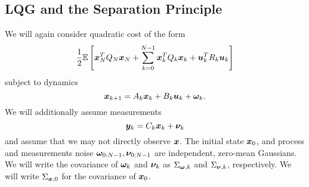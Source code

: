\subsection{LQG and the Separation Principle}

We will again consider quadratic cost of the form
\begin{equation}
    \frac{1}{2} \mathbb{E}\left[ \bm{x}_N^T Q_N \bm{x}_N + \sum_{k=0}^{N-1} \bm{x}_k^T Q_k \bm{x}_k + \bm{u}_k^T R_k \bm{u}_k \right]
\end{equation}
subject to dynamics
\begin{equation}
    \bm{x}_{k+1} = A_k \bm{x}_k + B_k \bm{u}_k + \bm{\omega}_{k}.
\end{equation}
We will additionally assume measurements
\begin{equation}
    \bm{y}_k = C_k \bm{x}_k + \bm{\nu}_k
\end{equation}
and assume that we may not directly observe $\bm{x}$. The initial state $\bm{x}_0$, and process and measurements noise $\bm{\omega}_{0:N-1},\bm{\nu}_{0:N-1}$ are independent, zero-mean Gaussians. We will write the covariance of $\bm{\omega}_k$ and $\bm{\nu}_k$ as $\Sigma_{\bm{\omega},k}$ and $\Sigma_{\bm{\nu},k}$, respectively. We will write $\Sigma_{\bm{x},0}$ for the covariance of $\bm{x}_0$.

